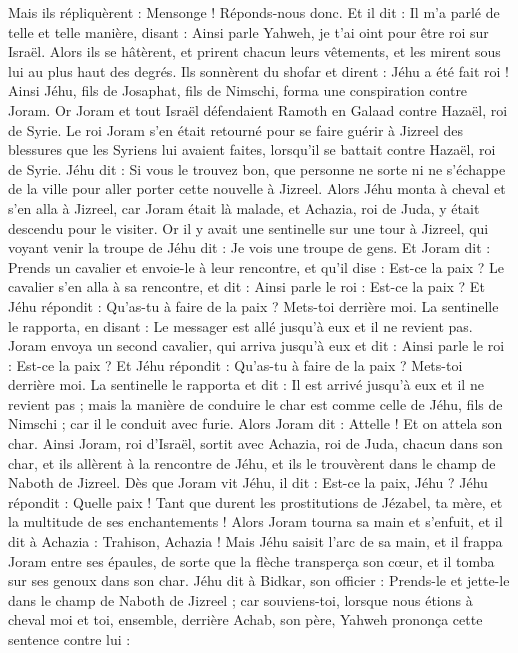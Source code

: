 \begin{multicols}{2}
Mais ils répliquèrent : Mensonge ! Réponds-nous donc. Et il dit : Il m'a parlé de telle et telle manière, disant : Ainsi parle Yahweh, je t'ai oint pour être roi sur Israël.
Alors ils se hâtèrent, et prirent chacun leurs vêtements, et les mirent sous lui au plus haut des degrés. Ils sonnèrent du shofar et dirent : Jéhu a été fait roi !
Ainsi Jéhu, fils de Josaphat, fils de Nimschi, forma une conspiration contre Joram. Or Joram et tout Israël défendaient Ramoth en Galaad contre Hazaël, roi de Syrie.
Le roi Joram s'en était retourné pour se faire guérir à Jizreel des blessures que les Syriens lui avaient faites, lorsqu'il se battait contre Hazaël, roi de Syrie. Jéhu dit : Si vous le trouvez bon, que personne ne sorte ni ne s'échappe de la ville pour aller porter cette nouvelle à Jizreel.
Alors Jéhu monta à cheval et s'en alla à Jizreel, car Joram était là malade, et Achazia, roi de Juda, y était descendu pour le visiter.
Or il y avait une sentinelle sur une tour à Jizreel, qui voyant venir la troupe de Jéhu dit : Je vois une troupe de gens. Et Joram dit : Prends un cavalier et envoie-le à leur rencontre, et qu'il dise : Est-ce la paix ?
Le cavalier s'en alla à sa rencontre, et dit : Ainsi parle le roi : Est-ce la paix ? Et Jéhu répondit : Qu'as-tu à faire de la paix ? Mets-toi derrière moi. La sentinelle le rapporta, en disant : Le messager est allé jusqu'à eux et il ne revient pas.
Joram envoya un second cavalier, qui arriva jusqu'à eux et dit : Ainsi parle le roi : Est-ce la paix ? Et Jéhu répondit : Qu'as-tu à faire de la paix ? Mets-toi derrière moi.
La sentinelle le rapporta et dit : Il est arrivé jusqu'à eux et il ne revient pas ; mais la manière de conduire le char est comme celle de Jéhu, fils de Nimschi ; car il le conduit avec furie.
Alors Joram dit : Attelle ! Et on attela son char. Ainsi Joram, roi d'Israël, sortit avec Achazia, roi de Juda, chacun dans son char, et ils allèrent à la rencontre de Jéhu, et ils le trouvèrent dans le champ de Naboth de Jizreel.
Dès que Joram vit Jéhu, il dit : Est-ce la paix, Jéhu ? Jéhu répondit : Quelle paix ! Tant que durent les prostitutions de Jézabel, ta mère, et la multitude de ses enchantements !
Alors Joram tourna sa main et s'enfuit, et il dit à Achazia : Trahison, Achazia !
Mais Jéhu saisit l'arc de sa main, et il frappa Joram entre ses épaules, de sorte que la flèche transperça son cœur, et il tomba sur ses genoux dans son char.
Jéhu dit à Bidkar, son officier : Prends-le et jette-le dans le champ de Naboth de Jizreel ; car souviens-toi, lorsque nous étions à cheval moi et toi, ensemble, derrière Achab, son père, Yahweh prononça cette sentence contre lui :

\end{multicols}
